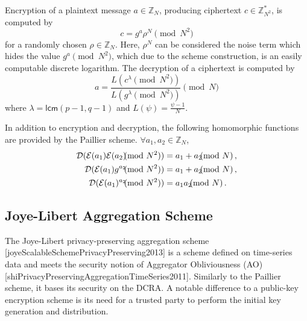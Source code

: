 Encryption of a plaintext message $a \in \mathbb{Z}_N$, producing ciphertext $c \in \mathbb{Z}^{*}_{N^2}$, is computed by
\begin{equation}
    c = g^a \rho^N \pmod{N^2}
\end{equation}
for a randomly chosen $\rho \in \mathbb{Z}_{N}$. Here, $\rho^N$ can be considered the noise term which hides the value $g^a \pmod{N^2}$, which due to the scheme construction, is an easily computable discrete logarithm. The decryption of a ciphertext is computed by
\begin{equation}
    a = \frac{L(c^\lambda\pmod{N^2})}{L(g^\lambda\pmod{N^2})} \pmod{N}
\end{equation}
where $\lambda = \mathsf{lcm}(p-1, q-1)$ and $L(\psi) = \frac{\psi-1}{N}$.

In addition to encryption and decryption, the following homomorphic functions are provided by the Paillier scheme. $\forall a_1,a_2 \in \mathbb{Z}_N$,
\begin{align}
    \mathcal{D}(\mathcal{E}(a_1)\mathcal{E}(a_2) \hspace{-7pt} \pmod{N^2}) &= a_1+a_2 \hspace{-7pt} \pmod{N}\,, \label{eqn:paillier_hom_add}\\
    \mathcal{D}(\mathcal{E}(a_1)g^{a_2} \hspace{-7pt} \pmod{N^2}) &= a_1+a_2\hspace{-7pt}\pmod{N}\,, \label{eqn:paillier_hom_plain_add}\\
    \mathcal{D}(\mathcal{E}(a_1)^{a_2} \hspace{-7pt} \pmod{N^2}) &= a_1a_2 \hspace{-7pt} \pmod{N}\,. \label{eqn:paillier_hom_mult}
\end{align}

% 
% 

\subsection{Joye-Libert Aggregation Scheme}
The Joye-Libert privacy-preserving aggregation scheme [joyeScalableSchemePrivacyPreserving2013] is a scheme defined on time-series data and meets the security notion of Aggregator Obliviousness (AO) [shiPrivacyPreservingAggregationTimeSeries2011]. Similarly to the Paillier scheme, it bases its security on the DCRA. A notable difference to a public-key encryption scheme is its need for a trusted party to perform the initial key generation and distribution.


